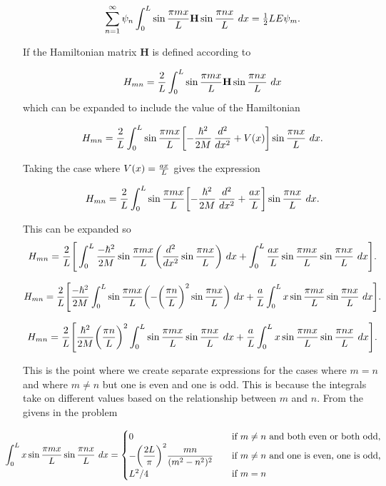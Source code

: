 \documentclass[11pt]{article}
\begin{document}
\[\sum_{n=1}^\infty \psi_n \int_0^L \sin {\pi m x\over L} \mathbf{H} \sin {\pi n x\over L}\ dx = \tfrac12 LE \psi_m.\]

    If the Hamiltonian matrix \(\mathbf{H}\) is defined according to

\[H_{mn} = {2\over L} \int_0^L \sin{\pi m x\over L} \mathbf{H}\sin{\pi n x\over L} \ d x\]
which can be expanded to include the value of the Hamiltonian

\[H_{mn} = {2\over L} \int_0^L \sin{\pi m x\over L} \biggl[ -{\hbar^2\over2M}\,{d^2\over d x^2} + V(x) \biggr] \sin{\pi n x\over L} \ d x.\]

Taking the case where \(V(x) = {ax \over L}\) gives the expression

\[H_{mn} = {2\over L} \int_0^L \sin{\pi m x\over L} \biggl[ -{\hbar^2\over2M}\,{d^2\over d x^2} + {ax \over L} \biggr] \sin{\pi n x\over L} \ d x.\]

This can be expanded so
\[H_{mn} = {2\over L}\Biggr[ \int_0^L \frac{-\hbar^2}{2M}\sin{\pi m x\over L} \biggr({d^2\over d x^2} \sin{\pi n x\over L}\biggr) \ d x + \int_0^L {ax \over L}\sin{\pi m x\over L} \sin{\pi n x\over L} \ d x \Biggr].\]

\[H_{mn} = {2\over L}\Biggr[\frac{-\hbar^2}{2M}\int_0^L \sin{\pi m x\over L} \biggr(-\biggr(\frac{\pi n}{L}\biggr)^2 \sin{\pi n x\over L}\biggr) \ d x
+ {a \over L}\int_0^L x\sin{\pi m x\over L} \sin{\pi n x\over L} \ d x \Biggr].\]

\[H_{mn} = {2\over L}\Biggr[\frac{\hbar^2}{2M}\biggr(\frac{\pi n}{L}\biggr)^2\int_0^L \sin{\pi m x\over L} \sin{\pi n x\over L} \ d x
+ {a \over L}\int_0^L x\sin{\pi m x\over L} \sin{\pi n x\over L} \ d x \Biggr].\]

This is the point where we create separate expressions for the cases
where \(m=n\) and where \(m \ne n\) but one is even and one is odd. This
is because the integrals take on different values based on the
relationship between \(m\) and \(n.\) From the givens in the problem

\[\hspace{-2em}
\int_0^L x \sin{\pi m x\over L} \sin{\pi n x\over L} \ d x
  = \begin{cases}
      0 & \quad\mbox{if $m\ne n$ and both even or both odd,} \\
      {\displaystyle-\biggl({2L\over\pi}\biggr)^2{mn\over(m^2-n^2)^2}}
        & \quad\mbox{if $m\ne n$ and one is even, one is odd,} \\
      L^2/4 & \quad\mbox{if $m=n$}
    \end{cases}\]
\end{document}
